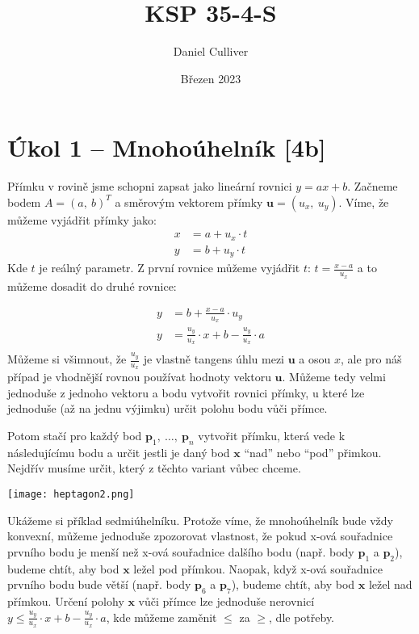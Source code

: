 \documentclass{../../../ksp}
\title{KSP 35-4-S}
\author{Daniel Culliver}
\date{Březen 2023}
\begin{document}
\maketitle

\section*{Úkol 1 – Mnohoúhelník [4b]}

Přímku v rovině jsme schopni zapsat jako lineární rovnici $y = ax + b$.
Začneme bodem $A = {(a,\ b)}^T$ a směrovým vektorem přímky $\bm{u} = (u_x,\ u_y)$.
Víme, že můžeme vyjádřit přímky jako:
\begin{align*}
    x &= a + u_x \cdot t\\
    y &= b + u_y \cdot t
\end{align*}
Kde $t$ je reálný parametr.
Z první rovnice můžeme vyjádřit $t$: $t = \frac{x-a}{u_x}$ a to můžeme dosadit do druhé rovnice:

\begin{align*}
    y &= b + \frac{x-a}{u_x} \cdot u_y\\
    y &= \frac{u_y}{u_x} \cdot x + b - \frac{u_y}{u_x} \cdot a\\
\end{align*}
Můžeme si všimnout, že $\frac{u_y}{u_x}$ je vlastně tangens úhlu mezi $\bm{u}$ a osou $x$,
ale pro náš případ je vhodnější rovnou používat hodnoty vektoru $\bm{u}$.
Můžeme tedy velmi jednoduše z jednoho vektoru a bodu vytvořit rovnici přímky,
u které lze jednoduše (až na jednu výjimku) určit polohu bodu vůči přímce.

Potom stačí pro každý bod $\bm{p}_1,\ \dots ,\ \bm{p}_n$ vytvořit přímku, která vede k následujícímu bodu
a určit jestli je daný bod $\bm{x}$ ``nad'' nebo ``pod'' přimkou.
Nejdřív musíme určit, který z těchto variant vůbec chceme.


\texttt{[image: heptagon2.png]}

Ukážeme si příklad sedmiúhelníku. Protože víme, že mnohoúhelník bude vždy konvexní, můžeme jednoduše zpozorovat vlastnost,
že pokud x-ová souřadnice prvního bodu je menší než x-ová souřadnice dalšího bodu (např. body $\bm{p}_1$ a $\bm{p}_2$),
budeme chtít, aby bod $\bm{x}$ ležel pod přímkou. Naopak, když x-ová souřadnice prvního bodu bude větší (např. body $\bm{p}_6$ a $\bm{p}_7$),
budeme chtít, aby bod $\bm{x}$ ležel nad přímkou.
Určení polohy $\bm{x}$ vůči přímce lze jednoduše nerovnicí $y \leq \frac{u_y}{u_x} \cdot x + b - \frac{u_y}{u_x} \cdot a$,
kde můžeme zaměnit $\leq$ za $\geq$, dle potřeby.
\end{document}

